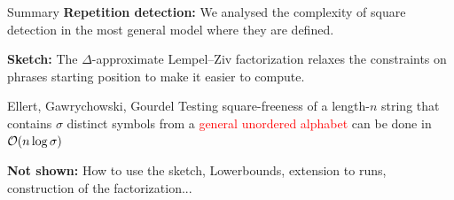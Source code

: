 \begin{frame}{Summary}
    \textbf{Repetition detection:} We analysed the complexity of square detection in the most general model where they are defined.
    \vfill
    
    \textbf{Sketch:} The $\Delta$-approximate Lempel--Ziv factorization relaxes the constraints on phrases starting position to make it easier to compute.
    \vfill
    \begin{myalertblock}{Ellert, Gawrychowski, Gourdel}
        Testing square-freeness of a length-$n$ string  that contains $\sigma$ distinct symbols from a \textcolor{red}{general unordered alphabet} can be done in $\mathcal{O}(n \log \sigma)$
    \end{myalertblock}
    \vfill
    \textbf{Not shown:} How to use the sketch, Lowerbounds, extension to runs, construction of the factorization...
\end{frame}
    